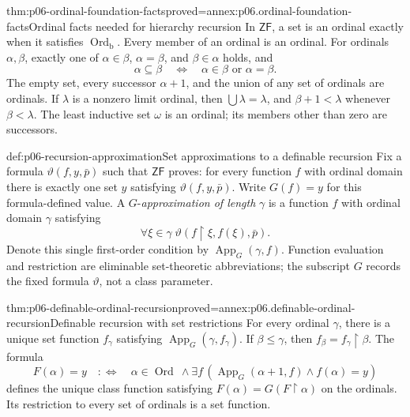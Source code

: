 \begin{hbtheorem}{thm:p06-ordinal-foundation-facts}{proved=annex:p06.ordinal-foundation-facts}{Ordinal facts needed for hierarchy recursion}
In \(\mathsf{ZF}\), a set is an ordinal exactly when it satisfies
\(\operatorname{Ord}_{\mathrm b}\).  Every member of an ordinal is an
ordinal.  For ordinals \(\alpha,\beta\), exactly one of
\(\alpha\in\beta\), \(\alpha=\beta\), and \(\beta\in\alpha\) holds,
and
\[
 \alpha\subseteq\beta
 \quad\Longleftrightarrow\quad
 \alpha\in\beta\text{ or }\alpha=\beta.
\]
The empty set, every successor \(\alpha+1\), and the union of any set
of ordinals are ordinals.  If \(\lambda\) is a nonzero limit ordinal,
then \(\bigcup\lambda=\lambda\), and \(\beta+1<\lambda\) whenever
\(\beta<\lambda\).  The least inductive set \(\omega\) is an ordinal;
its members other than zero are successors.
\end{hbtheorem}

\begin{hbdefinition}{def:p06-recursion-approximation}{Set approximations to a definable recursion}
Fix a formula \(\vartheta(f,y,\bar p)\) such that \(\mathsf{ZF}\) proves:
for every function \(f\) with ordinal domain there is exactly one
set \(y\) satisfying \(\vartheta(f,y,\bar p)\).
Write \(G(f)=y\) for this formula-defined value.  A
\(G\)-\emph{approximation of length} \(\gamma\) is a function \(f\)
with ordinal domain \(\gamma\) satisfying
\[
 \forall\xi\in\gamma\;
       \vartheta(f\mathbin{\upharpoonright}\xi,f(\xi),\bar p).
\]
Denote this single first-order condition by
\(\operatorname{App}_G(\gamma,f)\).  Function evaluation and restriction
are eliminable set-theoretic abbreviations; the subscript \(G\) records
the fixed formula \(\vartheta\), not a class parameter.
\end{hbdefinition}

\begin{hbtheorem}{thm:p06-definable-ordinal-recursion}{proved=annex:p06.definable-ordinal-recursion}{Definable recursion with set restrictions}
For every ordinal \(\gamma\), there is a unique set function
\(f_\gamma\) satisfying \(\operatorname{App}_G(\gamma,f_\gamma)\).
If \(\beta\leq\gamma\), then
\(f_\beta=f_\gamma\mathbin{\upharpoonright}\beta\).  The formula
\[
 F(\alpha)=y
 \quad:\Longleftrightarrow\quad
 \alpha\in\operatorname{Ord}\ \land
 \exists f\,
   (\operatorname{App}_G(\alpha+1,f)\land f(\alpha)=y)
\]
defines the unique class function satisfying
\(F(\alpha)=G(F\mathbin{\upharpoonright}\alpha)\) on the ordinals.
Its restriction to every set of ordinals is a set function.
\end{hbtheorem}

